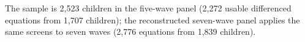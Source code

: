 The sample is 2,523 children in the five-wave panel (2,272 usable differenced equations from 1,707 children); the reconstructed seven-wave panel applies the same screens to seven waves (2,776 equations from 1,839 children).%
